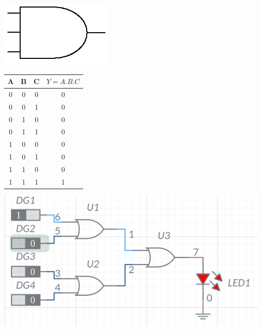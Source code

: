 \documentclass[a4paper, 12pt]{article}
\begin{document}
\begin{minipage}[c]{.5\textwidth}
  \centering
  \includegraphics[scale=0.5]{3-input-and-gate}
\end{minipage}
\begin{minipage}{.5\textwidth}
  \begin{center}
    \begin{tabular}{ |c|c|c|c| }
      \hline
      A & B & C & $Y = A.B.C$ \\
      \hline
      0 & 0 & 0 & 0 \\
      \hline
      0 & 0 & 1 & 0 \\
      \hline
      0 & 1 & 0 & 0 \\
      \hline
      0 & 1 & 1 & 0 \\
      \hline
      1 & 0 & 0 & 0 \\
      \hline 
      1 & 0 & 1 & 0 \\
      \hline
      1 & 1 & 0 & 0 \\
      \hline
      1 & 1 & 1 & 1 \\
      \hline
    \end{tabular}
  \end{center}
\end{minipage}

\begin{centering}
  \includegraphics[scale=0.5]{4-input-or}
\end{centering}
\end{document}
